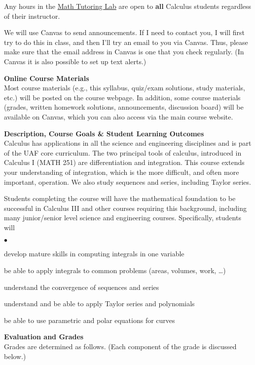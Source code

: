 \documentclass[12pt]{article}
\renewcommand{\emph}[1]{\textsf{\textbf{#1}}}
\newcommand{\localhead}[1]{\par\smallskip\textbf{#1} \smallskip\nobreak\\}%
\def\heading#1{\localhead{\large\emph{#1}}}
\newenvironment{clist}%
{\bgroup\parskip 0pt\begin{list}{$\bullet$}{\partopsep 4pt\topsep 0pt\itemsep -2pt}}%
{\end{list}\egroup}%
\begin{document}
Any hours in the \href{https://uaf.edu/dms/mathlab/}{Math Tutoring Lab} are open to \emph{all} Calculus students regardless of their instructor.

We will use Canvas to send announcements.  If I need to contact you, I will first try to do this in class, and then I'll try an email to you via Canvas.  Thus, please make sure that the email address in Canvas is one that you check regularly.  (In Canvas it is also possible to set up text alerts.)

\heading{Online Course Materials}
Most course materials (e.g., this syllabus, quiz/exam solutions, study materials, etc.) will be posted on the course webpage.  In addition, some course materials (grades, written homework solutions, announcements, discussion board) will be available on Canvas, which you can also access via the main course website.

\heading{Description, Course Goals \& Student Learning Outcomes}
Calculus has applications in all the science and engineering disciplines and is part of the UAF core curriculum.  The two principal tools of calculus, introduced in Calculus I (MATH 251) are differentiation and integration.  This course extends your understanding of integration, which is the more difficult, and often more important, operation.  We also study sequences and series, including Taylor series.

Students completing the course will have the mathematical foundation to be successful in Calculus III and other courses requiring this background, including many junior/senior level science and engineering courses.  Specifically, students will
\begin{clist}
\item develop mature skills in computing integrals in one variable
\item be able to apply integrals to common problems (areas, volumes, work, \dots)
\item understand the convergence of sequences and series
\item understand and be able to apply Taylor series and polynomials
\item be able to use parametric and polar equations for curves
\end{clist}

\heading{Evaluation and Grades}
Grades are determined as follows.  (Each component of the grade is discussed below.)
 
\end{document}
